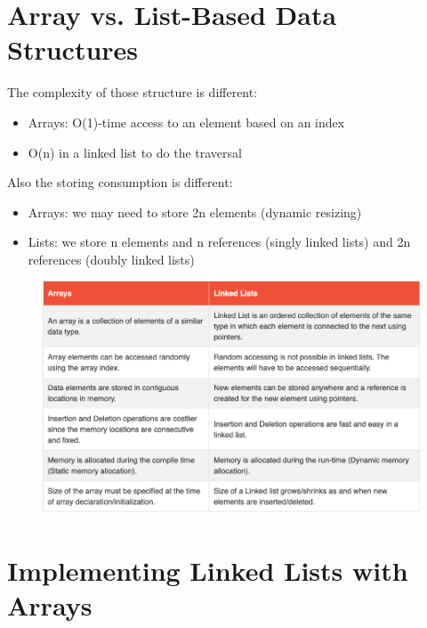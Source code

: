     \section{Array vs. List-Based Data Structures}
    The complexity of those structure is different:
    \begin{itemize}
        \item Arrays: O(1)-time access to an element based on an index
        \item O(n) in a linked list to do the traversal
    \end{itemize}
    Also the storing consumption is different:
    \begin{itemize}
        \item Arrays: we may need to store 2n elements (dynamic resizing)
        \item Lists: we store n elements and n references (singly linked lists) and 2n references (doubly linked lists)
    \end{itemize}
    
    \begin{figure}[h]
        \centering
        \includegraphics[width=0.9\linewidth]{immagini/06_data structure table .png}

    \end{figure}
        
    \section{Implementing Linked Lists with Arrays}

